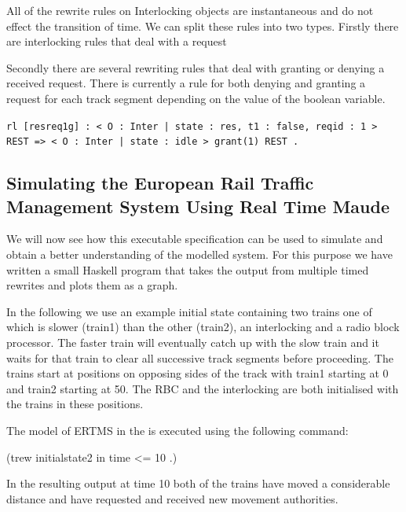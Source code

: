 All of the rewrite rules on Interlocking objects are instantaneous and do not effect the transition of time.  We can split these rules into two types. Firstly there are interlocking rules that deal with a request


Secondly there are several rewriting rules that deal with granting or denying a received request. There is currently a rule for both denying and granting a request for each track segment depending on the value of the boolean variable.
\begin{center}
\texttt{rl [resreq1g] : {< O : Inter | state : res, t1 : false,  reqid : 1 > REST} => {< O : Inter | state : idle > grant(1) REST} .}
\end{center}


\subsection{Simulating the European Rail Traffic Management System Using Real Time Maude}
We will now see how this executable specification can be used to simulate and obtain a better understanding of the modelled system. For this purpose we have written a small Haskell program that takes the output from multiple timed rewrites and plots them as a graph.

In the following we use an example initial state containing two trains one of which is slower (train1) than the other (train2), an interlocking and a radio block processor. The faster train will eventually catch up with the slow train and it waits for that train to clear all successive track segments before proceeding. The trains start at positions on opposing sides of the track with train1 starting at 0 and train2 starting at 50. The RBC and the interlocking are both initialised with the trains in these positions.

The model of ERTMS  in the  is executed using the following command:
\begin{center}
(trew initialstate2 in time <= 10 .)
\end{center}

In the resulting output at time 10 both of the trains have moved a considerable distance and have requested and received new movement authorities.
 
